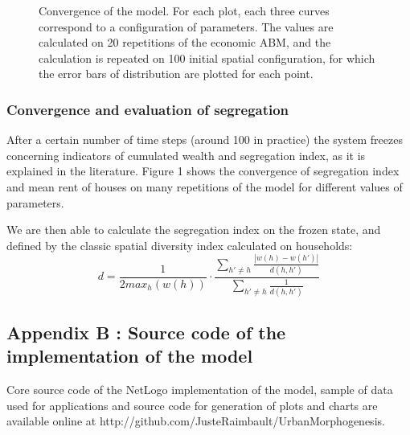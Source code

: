 \documentclass[a4paper,twocolumn,twoside,10pt]{article}
\begin{document}
\begin{figure}[htp]
\centering

\hfill{}

\caption{Convergence of the model. For each plot, each three curves correspond
to a configuration of parameters. The values are calculated on 20
repetitions of the economic ABM, and the calculation is repeated on
100 initial spatial configuration, for which the error bars of distribution
are plotted for each point.}

\label{fig8}

\end{figure}



\subsubsection*{Convergence and evaluation of segregation}

After a certain number of time steps (around 100 in practice) the
system freezes concerning indicators of cumulated wealth and segregation
index, as it is explained in the literature. Figure 1 shows the convergence
of segregation index and mean rent of houses on many repetitions of
the model for different values of parameters.

We are then able to calculate the segregation index on the frozen
state, and defined by the classic spatial diversity index calculated
on households:
\[
d=\frac{1}{2max_{h}(w(h))}\cdot\frac{\sum_{h'\neq h}\frac{\left|w(h)-w(h')\right|}{d(h,h')}}{\sum_{h'\neq h}\frac{1}{d(h,h')}}
\]


\bigskip{}
\bigskip{}

\subsection*{Appendix B : Source code of the implementation of the model}

Core source code of the NetLogo implementation of the model, sample
of data used for applications and source code for generation of plots
and charts are available online at
http://github.com/JusteRaimbault/UrbanMorphogenesis.
\end{document}
